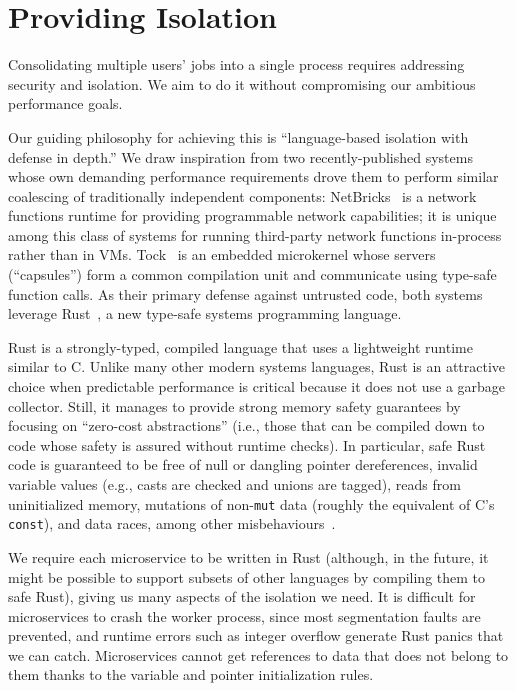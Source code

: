 \section{Providing Isolation}
\label{sec:isolation}

Consolidating multiple users' jobs into a single process requires
addressing security and isolation. We aim to do it without
compromising our ambitious performance goals.

Our guiding philosophy for achieving this is ``language-based isolation with defense
in depth.'' We draw inspiration from two recently-published systems whose own
demanding performance requirements drove them to perform similar coalescing of
traditionally independent components:  NetBricks~\cite{Panda2016} is a network
functions runtime for providing programmable network capabilities; it is unique among
this class of systems for running third-party network functions in-process rather
than in VMs.  Tock~\cite{Levy2017} is an embedded microkernel whose servers
(``capsules'') form a common compilation unit and communicate using type-safe
function calls.  As their primary defense against untrusted code, both systems
leverage Rust~\cite{www-rustlang}, a new type-safe systems programming language.


Rust is a strongly-typed, compiled language that uses a lightweight runtime
similar to C.  Unlike many other modern systems languages, Rust is an
attractive choice when predictable performance is critical because it does not use
a garbage collector.  Still, it manages to provide strong memory safety
guarantees by focusing on ``zero-cost abstractions'' (i.e., those that can be
compiled down to code whose safety is assured without runtime checks).  In
particular, safe Rust code is guaranteed to be free of null or dangling pointer
dereferences, invalid variable values (e.g., casts are checked and unions are
tagged), reads from uninitialized memory, mutations of non-\texttt{mut} data (roughly
the equivalent of C's \texttt{const}), and data races, among other
misbehaviours~\cite{www-rustlang-ub}.

We require each microservice to be written in Rust (although, in the future, it
might be possible to support subsets of other languages by compiling them to safe
Rust), giving us many aspects of the isolation we need.  It is difficult for
microservices to crash the worker process, since most segmentation faults are
prevented, and runtime errors such as integer overflow generate Rust panics that we
can catch.  Microservices cannot get references to data that does not belong to them
thanks to the variable and pointer initialization rules.

